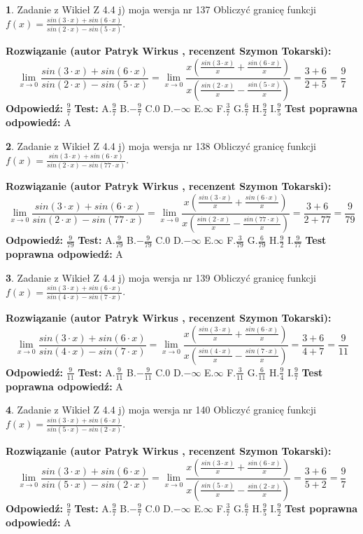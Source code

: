 \documentclass[12pt, a4paper]{article}
\theoremstyle{definition} %
\newtheorem{zad}{}
\newcommand{\zadStart}[1]{\begin{zad}#1\newline}
\newcommand{\zadStop}{\end{zad}}
\newcommand{\rozwStart}[2]{\noindent \textbf{Rozwiązanie (autor #1 , recenzent #2): }\newline}
\newcommand{\rozwStop}{\newline}
\newcommand{\odpStart}{\noindent \textbf{Odpowiedź:}\newline}
\newcommand{\odpStop}{\newline}
\newcommand{\testStart}{\noindent \textbf{Test:}\newline}
\newcommand{\testStop}{\newline}
\newcommand{\kluczStart}{\noindent \textbf{Test poprawna odpowiedź:}\newline}
\newcommand{\kluczStop}{\newline}
\begin{document}
\zadStart{Zadanie z Wikieł Z 4.4 j) moja wersja nr 137}
Obliczyć granicę funkcji $f(x)=\frac{sin(3\cdot x) +sin(6\cdot x)}{sin(2\cdot x) -sin(5\cdot x)}$.
\zadStop
\rozwStart{Patryk Wirkus}{Szymon Tokarski}
$$\lim\limits_{x\to 0}\frac{sin(3\cdot x) +sin(6\cdot x)}{sin(2\cdot x) -sin(5\cdot x)}=\lim\limits_{x\to 0}\frac{x(\frac{sin(3\cdot x)}{x}+\frac{sin(6\cdot x)}{x})}{x(\frac{sin(2\cdot x)}{x}-\frac{sin(5\cdot x)}{x})}=\frac{3+6}{2+5} = \frac{9}{7}$$
\rozwStop
\odpStart
$\frac{9}{7}$
\odpStop
\testStart
A.$\frac{9}{7}$
B.$-\frac{9}{7}$
C.$0$
D.$-\infty$
E.$\infty$
F.$\frac{3}{7}$
G.$\frac{6}{7}$
H.$\frac{9}{2}$
I.$\frac{9}{5}$
\testStop
\kluczStart
A
\kluczStop



\zadStart{Zadanie z Wikieł Z 4.4 j) moja wersja nr 138}
Obliczyć granicę funkcji $f(x)=\frac{sin(3\cdot x) +sin(6\cdot x)}{sin(2\cdot x) -sin(77\cdot x)}$.
\zadStop
\rozwStart{Patryk Wirkus}{Szymon Tokarski}
$$\lim\limits_{x\to 0}\frac{sin(3\cdot x) +sin(6\cdot x)}{sin(2\cdot x) -sin(77\cdot x)}=\lim\limits_{x\to 0}\frac{x(\frac{sin(3\cdot x)}{x}+\frac{sin(6\cdot x)}{x})}{x(\frac{sin(2\cdot x)}{x}-\frac{sin(77\cdot x)}{x})}=\frac{3+6}{2+77} = \frac{9}{79}$$
\rozwStop
\odpStart
$\frac{9}{79}$
\odpStop
\testStart
A.$\frac{9}{79}$
B.$-\frac{9}{79}$
C.$0$
D.$-\infty$
E.$\infty$
F.$\frac{3}{79}$
G.$\frac{6}{79}$
H.$\frac{9}{2}$
I.$\frac{9}{77}$
\testStop
\kluczStart
A
\kluczStop



\zadStart{Zadanie z Wikieł Z 4.4 j) moja wersja nr 139}
Obliczyć granicę funkcji $f(x)=\frac{sin(3\cdot x) +sin(6\cdot x)}{sin(4\cdot x) -sin(7\cdot x)}$.
\zadStop
\rozwStart{Patryk Wirkus}{Szymon Tokarski}
$$\lim\limits_{x\to 0}\frac{sin(3\cdot x) +sin(6\cdot x)}{sin(4\cdot x) -sin(7\cdot x)}=\lim\limits_{x\to 0}\frac{x(\frac{sin(3\cdot x)}{x}+\frac{sin(6\cdot x)}{x})}{x(\frac{sin(4\cdot x)}{x}-\frac{sin(7\cdot x)}{x})}=\frac{3+6}{4+7} = \frac{9}{11}$$
\rozwStop
\odpStart
$\frac{9}{11}$
\odpStop
\testStart
A.$\frac{9}{11}$
B.$-\frac{9}{11}$
C.$0$
D.$-\infty$
E.$\infty$
F.$\frac{3}{11}$
G.$\frac{6}{11}$
H.$\frac{9}{4}$
I.$\frac{9}{7}$
\testStop
\kluczStart
A
\kluczStop



\zadStart{Zadanie z Wikieł Z 4.4 j) moja wersja nr 140}
Obliczyć granicę funkcji $f(x)=\frac{sin(3\cdot x) +sin(6\cdot x)}{sin(5\cdot x) -sin(2\cdot x)}$.
\zadStop
\rozwStart{Patryk Wirkus}{Szymon Tokarski}
$$\lim\limits_{x\to 0}\frac{sin(3\cdot x) +sin(6\cdot x)}{sin(5\cdot x) -sin(2\cdot x)}=\lim\limits_{x\to 0}\frac{x(\frac{sin(3\cdot x)}{x}+\frac{sin(6\cdot x)}{x})}{x(\frac{sin(5\cdot x)}{x}-\frac{sin(2\cdot x)}{x})}=\frac{3+6}{5+2} = \frac{9}{7}$$
\rozwStop
\odpStart
$\frac{9}{7}$
\odpStop
\testStart
A.$\frac{9}{7}$
B.$-\frac{9}{7}$
C.$0$
D.$-\infty$
E.$\infty$
F.$\frac{3}{7}$
G.$\frac{6}{7}$
H.$\frac{9}{5}$
I.$\frac{9}{2}$
\testStop
\kluczStart
A
\kluczStop
\end{document}
